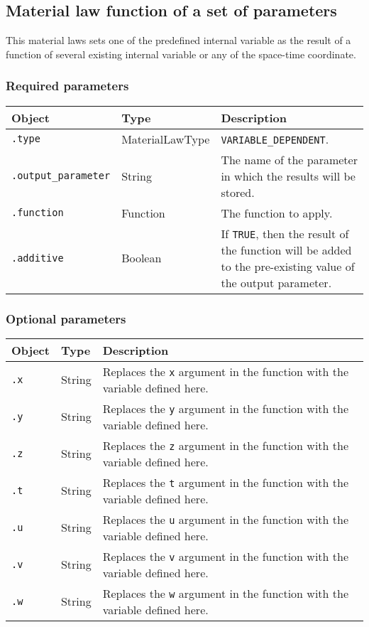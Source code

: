 \documentclass[10pt]{article}
\begin{document}
\subsection{Material law function of a set of parameters}

This material laws sets one of the predefined internal variable as the result of a function of several existing internal variable or any of the space-time coordinate.

\subsubsection*{Required parameters}

\begin{tabularx}{\textwidth}{llX}
\hline 
Object & Type & Description \\ 
\hline 
\verb+.type+ & MaterialLawType & \verb+VARIABLE_DEPENDENT+. \\ 
\verb+.output_parameter+ & String & The name of the parameter in which the results will be stored.\\
\verb+.function+ & Function & The function to apply. \\
\verb+.additive+ & Boolean & If \verb+TRUE+, then the result of the function will be added to the pre-existing value of the output parameter.\\
\hline 
\end{tabularx}

\subsubsection*{Optional parameters}

\begin{tabularx}{\textwidth}{llX}
\hline 
Object & Type & Description \\ 
\hline 
\verb+.x+ & String & Replaces the \verb+x+ argument in the function with the variable defined here. \\ 
\verb+.y+ & String & Replaces the \verb+y+ argument in the function with the variable defined here. \\ 
\verb+.z+ & String & Replaces the \verb+z+ argument in the function with the variable defined here. \\ 
\verb+.t+ & String & Replaces the \verb+t+ argument in the function with the variable defined here. \\ 
\verb+.u+ & String & Replaces the \verb+u+ argument in the function with the variable defined here. \\ 
\verb+.v+ & String & Replaces the \verb+v+ argument in the function with the variable defined here. \\ 
\verb+.w+ & String & Replaces the \verb+w+ argument in the function with the variable defined here. \\ 
\hline 
\end{tabularx}
\end{document}
